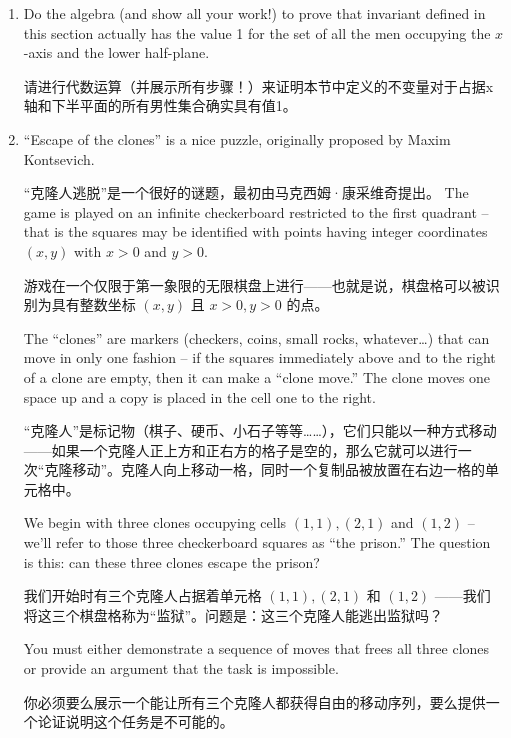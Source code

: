 \begin{enumerate}
    \item Do the algebra (and show all your work!) to prove that invariant
    defined in this section actually has the value 1 for the set of all the
    men occupying the $x$-axis and the lower half-plane.

    \noindent 请进行代数运算（并展示所有步骤！）来证明本节中定义的不变量对于占据x轴和下半平面的所有男性集合确实具有值1。
    \wbvfill
    
    \workbookpagebreak
    
    \item ``Escape of the clones'' is a  nice puzzle, originally proposed by Maxim Kontsevich.
    
    \noindent “克隆人逃脱”是一个很好的谜题，最初由马克西姆·康采维奇提出。
    The game
    is played on an infinite checkerboard restricted to the first quadrant -- that is the squares may be 
    identified with points having integer coordinates $(x,y)$ with $x>0$ and $y>0$.

    游戏在一个仅限于第一象限的无限棋盘上进行——也就是说，棋盘格可以被识别为具有整数坐标 $(x,y)$ 且 $x>0, y>0$ 的点。

    The ``clones'' are markers
    (checkers, coins, small rocks, whatever\ldots) that can move in only one fashion -- if the squares immediately
    above and to the right of a clone are empty, then it can make a ``clone move.''   The clone moves one space
    up and a copy is placed in the cell one to the right.

    \noindent “克隆人”是标记物（棋子、硬币、小石子等等……），它们只能以一种方式移动——如果一个克隆人正上方和正右方的格子是空的，那么它就可以进行一次“克隆移动”。克隆人向上移动一格，同时一个复制品被放置在右边一格的单元格中。

    We begin with three clones occupying cells $(1,1), (2,1)$ and $(1,2)$ -- we'll refer to those three checkerboard squares as ``the prison.''  The question is this:  can these
    three clones escape the prison?

    我们开始时有三个克隆人占据着单元格 $(1,1), (2,1)$ 和 $(1,2)$ ——我们将这三个棋盘格称为“监狱”。问题是：这三个克隆人能逃出监狱吗？

    You must either demonstrate a sequence of moves that frees all three clones or provide an argument that the task is impossible.

    你必须要么展示一个能让所有三个克隆人都获得自由的移动序列，要么提供一个论证说明这个任务是不可能的。
    \wbvfill
    
    \end{enumerate}
    
